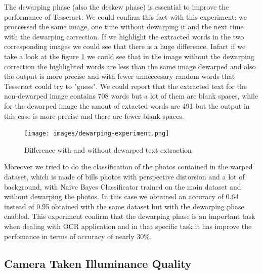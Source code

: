 \documentclass[10pt,twocolumn,letterpaper]{article}
\begin{document}
The dewarping phase (also the deskew phase) is essential to improve the
performance of Tesseract. We could confirm this fact with this
experiment: we proccessed the same image, one time without dewarping
it and the next time with the dewarping correction. If we highlight
the extracted words in the two corresponding images we could see that
there is a huge difference. Infact if we take a look at the figure
\ref{dewarping-experiment} we could see that in the image without the
dewarping correction the highlighted words are less than the same image
dewarped and also the output is more precise and with fewer
unneccesary random words that Tesseract could try to "guess". We could
report that the extracted text for the non-dewarped image contains 708
words but a lot of them are blank spaces, while for the dewarped image
the amout of extacted words are 491 but the output in this case is
more precise and there are fewer blank spaces.

\begin{figure}[b]
  \centering
  \texttt{[image: images/dewarping-experiment.png]}
  \caption{Difference with and without dewarped text extraction}
  \label{dewarping-experiment}
\end{figure}

Moreover we tried to do the classification of the photos contained in
the warped dataset, which is made of bills photos with perspective
distorsion and a lot of background, with Naive Bayes Classificator
trained on the main dataset and without dewarping the photos. In this
case we obtained an accuracy of 0.64 instead of 0.95 obtained with the
same dataset but with the dewarping phase enabled. This experiment
confirm that the dewarping phase is an important task when dealing
with OCR application and in that specific task it has improve the
perfomance in terms of accuracy of nearly 30\%.

\subsection{Camera Taken Illuminance Quality}
\end{document}
